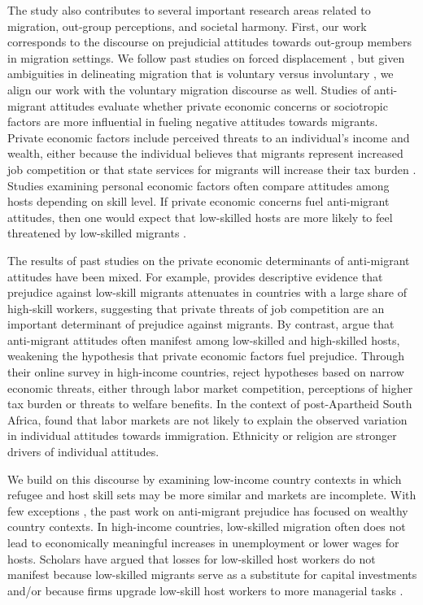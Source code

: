 \documentclass[a4paper,12pt]{article}
\begin{document}
The study also contributes to several important research areas related to migration, out-group perceptions, and societal harmony. First, our work corresponds to the discourse on prejudicial attitudes towards out-group members in migration settings. We follow past studies on forced displacement  \citep{hangartner2019does, adida2018perspective, hatton2017refugees}, but given ambiguities in delineating migration that is voluntary versus involuntary \citep{bakewell2021unsettling}, we align our work with the voluntary migration discourse as well.  Studies of anti-migrant attitudes evaluate whether private economic concerns or sociotropic factors are more influential in fueling negative attitudes towards migrants. Private economic factors include perceived threats to an individual's income and wealth, either because the individual believes that migrants represent increased job competition or that state services for migrants will increase their tax burden \citep{muller2020individual}. Studies examining personal economic factors often compare attitudes among hosts depending on skill level. If private economic concerns fuel anti-migrant attitudes, then one would expect that low-skilled hosts are more likely to feel threatened by low-skilled migrants \citep{hainmueller2010attitudes, mayda2006against}. 

The results of past studies on the private economic determinants of anti-migrant attitudes have been mixed. For example, \cite{mayda2006against} provides descriptive evidence that prejudice against low-skill migrants attenuates in countries with a large share of high-skill workers, suggesting that private threats of job competition are an important determinant of prejudice against migrants. By contrast, \cite{hainmueller2014public} argue that anti-migrant attitudes often manifest among low-skilled and high-skilled hosts, weakening the hypothesis that private economic factors fuel prejudice. Through their online survey in high-income countries, \citet{valentino2019} reject hypotheses based on narrow economic threats, either through labor market competition, perceptions of higher tax burden or threats to welfare benefits. In the context of post-Apartheid South Africa, \citet{facchini2013} found that labor markets are not likely to explain the observed variation in individual attitudes towards immigration. Ethnicity or religion are stronger drivers of individual attitudes.  

We build on this discourse by examining low-income country contexts in which refugee and host skill sets may be more similar and markets are incomplete. With few exceptions \citep{mayda2006against, facchini2013}, the past work on anti-migrant prejudice has focused on wealthy country contexts. In high-income countries, low-skilled migration often does not lead to economically meaningful increases in unemployment or lower wages for hosts. Scholars have argued that losses for low-skilled host workers do not manifest because low-skilled migrants serve as a substitute for capital investments \citep{clemens2018immigration} and/or because firms upgrade low-skill host workers to more managerial tasks \citep{foged2016immigrants}. 
\end{document}
